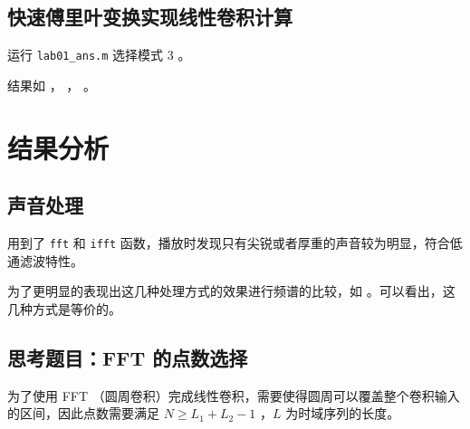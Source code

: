 \documentclass[lang=cn,11pt,a4paper,cite=authoryear]{elegantpaper}
\begin{document}



\subsection{快速傅里叶变换实现线性卷积计算}


运行 \lstinline{lab01_ans.m} 选择模式 3 。

结果如 ， ，  。





\section{结果分析}

\subsection{声音处理}

用到了 \lstinline{fft} 和 \lstinline{ifft} 函数，播放时发现只有尖锐或者厚重的声音较为明显，符合低通滤波特性。

为了更明显的表现出这几种处理方式的效果进行频谱的比较，如  。可以看出，这几种方式是等价的。


\subsection{思考题目：FFT 的点数选择}

为了使用 FFT （圆周卷积）完成线性卷积，需要使得圆周可以覆盖整个卷积输入的区间，因此点数需要满足 \(N \ge L_1 + L_2 - 1\) ，\(L\) 为时域序列的长度。
\end{document}
